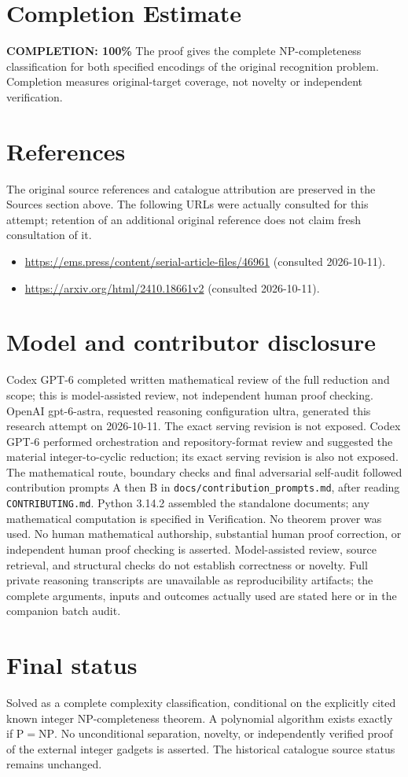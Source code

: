 \documentclass[11pt]{article}
\begin{document}
\section{Completion Estimate}
\noindent\textbf{COMPLETION: 100\%}
The proof gives the complete NP-completeness classification for both specified
encodings of the original recognition problem. Completion measures original-target
coverage, not novelty or independent verification.
\section{References}
The original source references and catalogue attribution are preserved in the
Sources section above. The following URLs were actually consulted for this attempt;
retention of an additional original reference does not claim fresh consultation of it.
\begin{itemize}
\item \url{https://ems.press/content/serial-article-files/46961} (consulted 2026-10-11). 
\item \url{https://arxiv.org/html/2410.18661v2} (consulted 2026-10-11). 
\end{itemize}
\section{Model and contributor disclosure}
Codex GPT-6 completed written mathematical review of the full reduction and scope; this is model-assisted review, not independent human proof checking.
OpenAI gpt-6-astra, requested reasoning configuration ultra, generated this research
attempt on 2026-10-11. The exact serving revision is not exposed. Codex GPT-6
performed orchestration and repository-format review and suggested the material integer-to-cyclic reduction; its exact serving revision
is also not exposed. The mathematical route, boundary checks and final adversarial
self-audit followed contribution prompts A then B in
\texttt{docs/contribution\_prompts.md}, after reading \texttt{CONTRIBUTING.md}.
Python 3.14.2 assembled the standalone documents; any mathematical computation is
specified in Verification. No theorem prover was used. No human mathematical
authorship, substantial human proof correction, or independent human proof checking
is asserted. Model-assisted review, source retrieval, and structural checks do not
establish correctness or novelty. Full private reasoning transcripts are unavailable
as reproducibility artifacts; the complete arguments, inputs and outcomes actually
used are stated here or in the companion batch audit.
\section{Final status}
Solved as a complete complexity classification, conditional on the explicitly cited
known integer NP-completeness theorem. A polynomial algorithm exists exactly if
$\mathrm P=\mathrm{NP}$. No unconditional separation, novelty, or independently
verified proof of the external integer gadgets is asserted. The historical catalogue
source status remains unchanged.
\end{document}
